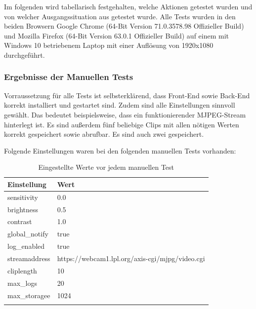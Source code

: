 Im folgenden wird tabellarisch festgehalten, welche Aktionen getestet wurden und von welcher Ausgangssituation aus getestet wurde. Alle Tests wurden in den beiden Browsern Google Chrome (64-Bit Version 71.0.3578.98 Offizieller Build) und Mozilla Firefox (64-Bit Version 63.0.1 Offizieller Build) auf einem mit Windows 10 betriebenem Laptop mit einer Auflösung von 1920x1080 durchgeführt. 

\subsubsection{Ergebnisse der Manuellen Tests}
Vorraussetzung für alle Tests ist selbsterklärend, dass Front-End sowie Back-End korrekt installiert und gestartet sind. Zudem sind alle Einstellungen sinnvoll gewählt. Das bedeutet beispielsweise, dass ein funktionierender MJPEG-Stream hinterlegt ist. Es sind außerdem fünf beliebige Clips mit allen nötigen Werten korrekt gespeichert sowie abrufbar. Es sind auch zwei gespeichert.

Folgende Einstellungen waren bei den folgenden manuellen Tests vorhanden:

\begin{longtable}{| p{} | p{} |}
	\hline
	\textbf{Einstellung} & \textbf{Wert} \\ \hline

	sensitivity & 0.0 \\ \hline
		
	brightness & 0.5 \\ \hline
		
	contrast & 1.0 \\ \hline
		
	global\_notify & true \\ \hline
		
	log\_enabled & true \\ \hline
		
	streamaddress & https://webcam1.lpl.org/axis-cgi/mjpg/video.cgi \\ \hline
		
	cliplength & 10 \\ \hline
		
	max\_logs & 20 \\ \hline
		
	max\_storagee & 1024 \\ \hline
	
\caption{Eingestellte Werte vor jedem manuellen Test}
\label{tab:eingestellte_werte_vor_tests}
\end{longtable}

